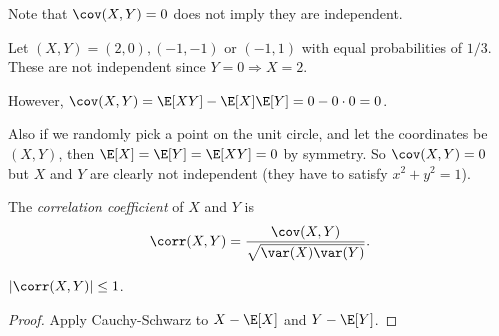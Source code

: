 \documentclass[a4paper]{article}
\begin{document}
Note that $\cov(X, Y) = 0$ does not imply they are independent.
\begin{eg}
  Let $(X, Y) = (2, 0), (-1, -1)$ or $(-1, 1)$ with equal probabilities of $1/3$. These are not independent since $Y = 0\Rightarrow X = 2$.

  However, $\cov (X, Y) = \E[XY] - \E[X]\E[Y] = 0 - 0\cdot 0 = 0$.

  Also if we randomly pick a point on the unit circle, and let the coordinates be $(X, Y)$, then $\E[X] = \E[Y] = \E[XY] = 0$ by symmetry. So $\cov(X, Y) = 0$ but $X$ and $Y$ are clearly not independent (they have to satisfy $x^2 + y^2 = 1$).
\end{eg}

\begin{defi}
  The \emph{correlation coefficient} of $X$ and $Y$ is
  \[
    \corr(X, Y) = \frac{\cov (X, Y)}{\sqrt{\var (X)\var (Y)}}.
  \]
\end{defi}
\begin{cor}
  $|\corr(X, Y)| \leq 1$.
\end{cor}

\begin{proof}
  Apply Cauchy-Schwarz to $X - \E[X]$ and $Y - \E[Y]$.
\end{proof}
\end{document}
